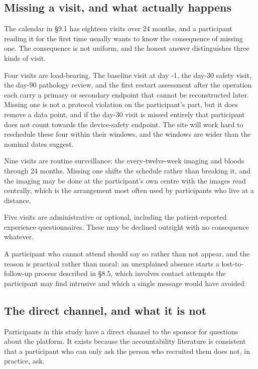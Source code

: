 \vspace{0.30em}

\subsection{Missing a visit, and what actually happens}

The calendar in \S 9.1 has eighteen visits over 24 months, and a participant
reading it for the first time usually wants to know the consequence of missing
one. The consequence is not uniform, and the honest answer distinguishes three
kinds of visit.

Four visits are load-bearing. The baseline visit at day -1, the day-30 safety
visit, the day-90 pathology review, and the first restart assessment after the
operation each carry a primary or secondary endpoint that cannot be
reconstructed later. Missing one is not a protocol violation on the
participant's part, but it does remove a data point, and if the day-30 visit is
missed entirely that participant does not count towards the device-safety
endpoint. The site will work hard to reschedule these four within their windows,
and the windows are wider than the nominal dates suggest.

Nine visits are routine surveillance: the every-twelve-week imaging and bloods
through 24 months. Missing one shifts the schedule rather than breaking it, and
the imaging may be done at the participant's own centre with the images read
centrally, which is the arrangement most often used by participants who live at
a distance.

Five visits are administrative or optional, including the patient-reported
experience questionnaires. These may be declined outright with no consequence
whatever.

A participant who cannot attend should say so rather than not appear, and the
reason is practical rather than moral: an unexplained absence starts a
lost-to-follow-up process described in \S 8.5, which involves contact attempts
the participant may find intrusive and which a single message would have
avoided.

\subsection{The direct channel, and what it is not}

Participants in this study have a direct channel to the sponsor for questions
about the platform. It exists because the accountability literature is
consistent that a participant who can only ask the person who recruited them
does not, in practice, ask.

